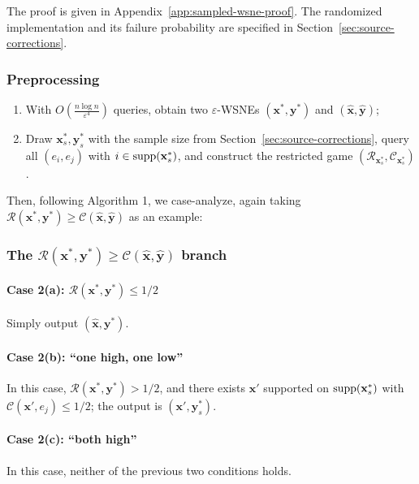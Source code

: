 The proof is given in Appendix~\ref{app:sampled-wsne-proof}. The randomized implementation and its failure probability are specified in Section~\ref{sec:source-corrections}.

\subsubsection{Preprocessing}

\begin{enumerate}
  \item With \(O\left(\frac{n \log n}{\varepsilon^4}\right)\) queries, obtain two \(\varepsilon\)-WSNEs \((\mathbf{x}^*, \mathbf{y}^*)\) and \((\hat{\mathbf{x}}, \hat{\mathbf{y}})\);
  \item Draw \(\mathbf{x}_s^*, \mathbf{y}_s^*\) with the sample size from Section~\ref{sec:source-corrections}, query all \((e_i, e_j)\) with \(i \in \operatorname{supp}(\mathbf{x}_s^*)\), and construct the restricted game \((\mathcal{R}_{\mathbf{x}_s^*}, \mathcal{C}_{\mathbf{x}_s^*})\).
\end{enumerate}

Then, following Algorithm 1, we case-analyze, again taking \(\mathcal{R}(\mathbf{x}^*,\mathbf{y}^*) \ge \mathcal{C}(\hat{\mathbf{x}},\hat{\mathbf{y}})\) as an example:

\subsubsection{The \texorpdfstring{\(\mathcal{R}(\mathbf{x}^*, \mathbf{y}^*) \ge \mathcal{C}(\hat{\mathbf{x}}, \hat{\mathbf{y}})\)}{R(x*,y*) >= C(xh,yh)} branch}

\paragraph{Case 2(a): \(\mathcal{R}(\mathbf{x}^*,\mathbf{y}^*) \le 1/2\)}
Simply output \((\hat{\mathbf{x}}, \mathbf{y}^*)\).

\paragraph{Case 2(b): ``one high, one low''}
In this case, \(\mathcal{R}(\mathbf{x}^*,\mathbf{y}^*) > 1/2\), and there exists \(\mathbf{x}'\) supported on \(\operatorname{supp}(\mathbf{x}_s^*)\) with \(\mathcal{C}(\mathbf{x}', e_j) \le 1/2\); the output is \((\mathbf{x}', \mathbf{y}_s^*)\).

\paragraph{Case 2(c): ``both high''}
In this case, neither of the previous two conditions holds.

